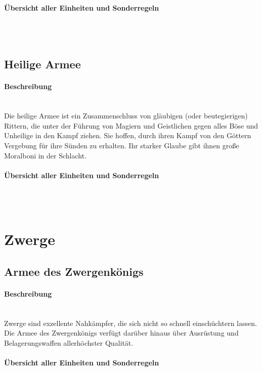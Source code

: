 \documentclass[a4paper,11pt]{report}
\begin{document}
\paragraph{Übersicht aller Einheiten und Sonderregeln}~\\
\\


\subsection{Heilige Armee}
\paragraph{Beschreibung}~\\
Die heilige Armee ist ein Zusammenschluss von gläubigen (oder beutegierigen) Rittern, die unter der Führung von Magiern und Geistlichen gegen alles Böse und Unheilige in den Kampf ziehen. Sie hoffen, durch ihren Kampf von den Göttern Vergebung für ihre Sünden zu erhalten.
Ihr starker Glaube gibt ihnen große Moralboni in der Schlacht.

\paragraph{Übersicht aller Einheiten und Sonderregeln}~\\
\\



\section{Zwerge}
\subsection{Armee des Zwergenkönigs}
\paragraph{Beschreibung}~\\
Zwerge sind exzellente Nahkämpfer, die sich nicht so schnell einschüchtern lassen. Die Armee des Zwergenkönigs verfügt darüber hinaus über Ausrüstung und Belagerungswaffen allerhöchster Qualität.

\paragraph{Übersicht aller Einheiten und Sonderregeln}~\\
%
\\

\end{document}
